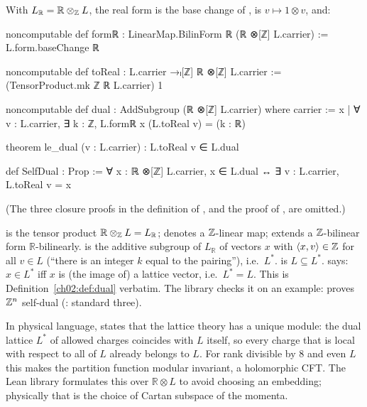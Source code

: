 \begin{definition}\label{ch02:def:voadual}
With $L_{\mathbb{R}}=\mathbb{R}\otimes_{{\mathbb{Z}}} L$, the real form  is the base change of
,  is $v\mapsto1\otimes v$, and:
\end{definition}
\begin{leancode}
noncomputable def formℝ : LinearMap.BilinForm ℝ (ℝ ⊗[ℤ] L.carrier) := L.form.baseChange ℝ

noncomputable def toReal : L.carrier →ₗ[ℤ] ℝ ⊗[ℤ] L.carrier :=
  (TensorProduct.mk ℤ ℝ L.carrier) 1

noncomputable def dual : AddSubgroup (ℝ ⊗[ℤ] L.carrier) where
  carrier := {x | ∀ v : L.carrier, ∃ k : ℤ, L.formℝ x (L.toReal v) = (k : ℝ)}

theorem le_dual (v : L.carrier) : L.toReal v ∈ L.dual

def SelfDual : Prop := ∀ x : ℝ ⊗[ℤ] L.carrier, x ∈ L.dual ↔ ∃ v : L.carrier, L.toReal v = x
\end{leancode}
(The three closure proofs in the definition of , and the proof of , are
omitted.)
\begin{dictionary}
 is the tensor product $\mathbb{R}\otimes_{{\mathbb{Z}}} L=L_{\mathbb{R}}$;
 denotes a ${\mathbb{Z}}$-linear map;  extends a ${\mathbb{Z}}$-bilinear form
$\mathbb{R}$-bilinearly.   is the additive subgroup of $L_{\mathbb{R}}$ of vectors $x$
with $\langle x,v\rangle\in{\mathbb{Z}}$ for all $v\in L$ (``there is an integer $k$ equal to the
pairing''), i.e.\ $L^*$.   is $L\subseteq L^*$.   says: $x\in L^*$
iff $x$ is (the image of) a lattice vector, i.e.\ $L^*=L$.  This is Definition~\ref{ch02:def:dual}
verbatim.  The library checks it on an example:  proves ${\mathbb{Z}}^n$
self-dual (: standard three).
\end{dictionary}
\begin{physics}
In physical language,  states that the lattice theory has a unique module: the dual lattice $L^*$ of allowed charges coincides with $L$ itself, so every charge that is local with respect to all of $L$ already belongs to $L$. For rank divisible by $8$ and even $L$ this makes the partition function modular invariant, a holomorphic CFT. The Lean library formulates this over $\mathbb{R}\otimes L$ to avoid choosing an embedding; physically that is the choice of Cartan subspace of the momenta.
\end{physics}

